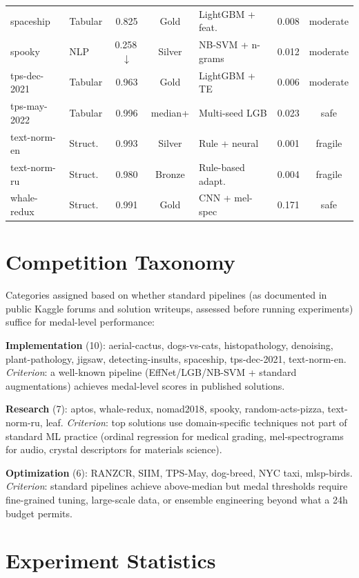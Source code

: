 \documentclass{article}
\begin{document}
\begin{table}[h]
\begin{tabular}{llcclcc}
spaceship & Tabular & 0.825 & Gold & LightGBM + feat. & 0.008 & moderate \\
spooky & NLP & 0.258\,$\downarrow$ & Silver & NB-SVM + n-grams & 0.012 & moderate \\
tps-dec-2021 & Tabular & 0.963 & Gold & LightGBM + TE & 0.006 & moderate \\
tps-may-2022 & Tabular & 0.996 & median+ & Multi-seed LGB & 0.023 & safe \\
text-norm-en & Struct. & 0.993 & Silver & Rule + neural & 0.001 & fragile \\
text-norm-ru & Struct. & 0.980 & Bronze & Rule-based adapt. & 0.004 & fragile \\
whale-redux & Struct. & 0.991 & Gold & CNN + mel-spec & 0.171 & safe \\
\bottomrule
\end{tabular}
\end{table}

\section{Competition Taxonomy}
\label{app:taxonomy}

Categories assigned based on whether standard pipelines (as documented in public Kaggle forums and solution writeups, assessed before running experiments) suffice for medal-level performance:

\textbf{Implementation} (10): aerial-cactus, dogs-vs-cats, histopathology, denoising, plant-pathology, jigsaw, detecting-insults, spaceship, tps-dec-2021, text-norm-en. \emph{Criterion}: a well-known pipeline (EffNet/LGB/NB-SVM + standard augmentations) achieves medal-level scores in published solutions.

\textbf{Research} (7): aptos, whale-redux, nomad2018, spooky, random-acts-pizza, text-norm-ru, leaf. \emph{Criterion}: top solutions use domain-specific techniques not part of standard ML practice (ordinal regression for medical grading, mel-spectrograms for audio, crystal descriptors for materials science).

\textbf{Optimization} (6): RANZCR, SIIM, TPS-May, dog-breed, NYC taxi, mlsp-birds. \emph{Criterion}: standard pipelines achieve above-median but medal thresholds require fine-grained tuning, large-scale data, or ensemble engineering beyond what a 24h budget permits.

\section{Experiment Statistics}
\label{app:stats}
\end{document}
